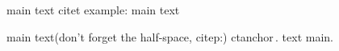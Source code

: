 \documentclass{article}
\begin{document}
main text citet example: \citet{Test:Book} main text

main text(don't forget the half-space, citep:) ctanchor\,\citep{Test:Book}.
text main.



\end{document}
